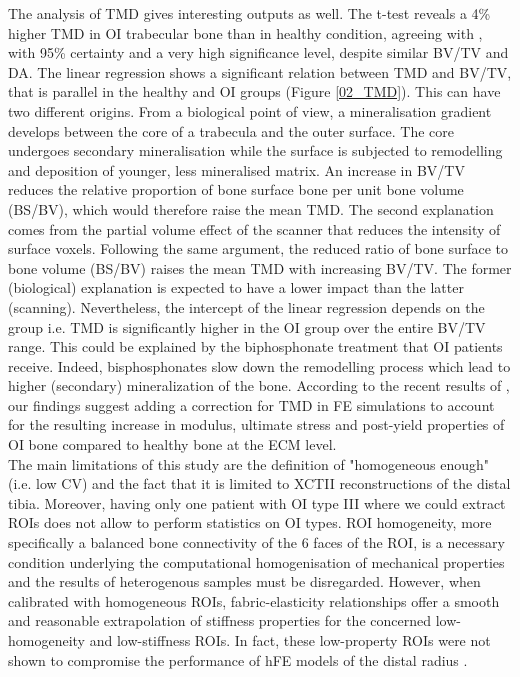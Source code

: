 \documentclass[a4paper,fleqn]{DC_ArtStyle}
\begin{document}
	The analysis of TMD gives interesting outputs as well. The t-test reveals a 4\% higher TMD in OI trabecular bone than in healthy condition, agreeing with \citeauthor{Boyde1999}\cite{Boyde1999}, with 95\% certainty and a very high significance level, despite similar BV/TV and DA. The linear regression shows a significant relation between TMD and BV/TV, that is parallel in the healthy and OI groups (Figure \ref{02_TMD}). This can have two different origins. From a biological point of view, a mineralisation gradient develops between the core of a trabecula and the outer surface. The core undergoes secondary mineralisation while the surface is subjected to remodelling and deposition of younger, less mineralised matrix. An increase in BV/TV reduces the relative proportion of bone surface bone per unit bone volume (BS/BV), which would therefore raise the mean TMD. The second explanation comes from the partial volume effect of the scanner that reduces the intensity of surface voxels. Following the same argument, the reduced ratio of bone surface to bone volume (BS/BV) raises the mean TMD with increasing BV/TV. The former (biological) explanation is expected to have a lower impact than the latter (scanning). Nevertheless, the intercept of the linear regression depends on the group i.e. TMD is significantly higher in the OI group over the entire BV/TV range. This could be explained by the biphosphonate treatment that OI patients receive. Indeed, bisphosphonates slow down the remodelling process which lead to higher (secondary) mineralization of the bone. According to the recent results of \citeauthor{Indermaur2021}\cite{Indermaur2021}, our findings suggest adding a correction for TMD in FE simulations to account for the resulting increase in modulus, ultimate stress and post-yield properties of OI bone compared to healthy bone at the ECM level.\\
	
	The main limitations of this study are the definition of "homogeneous enough" (i.e. low CV) and the fact that it is limited to XCTII reconstructions of the distal tibia. Moreover, having only one patient with OI type III where we could extract ROIs does not allow to perform statistics on OI types. ROI homogeneity, more specifically a balanced bone connectivity of the 6 faces of the ROI, is a necessary condition underlying the computational homogenisation of mechanical properties and the results of heterogenous samples must be disregarded. However, when calibrated with homogeneous ROIs, fabric-elas\-ticity relationships offer a smooth and reasonable extrapolation of stiffness properties for the concerned low-homogeneity and low-stiffness ROIs. In fact, these low-property ROIs were not shown to compromise the performance of hFE models of the distal radius \cite{Varga2011, Hosseini2017, AriasMoreno2019}.\\
	
\end{document}
